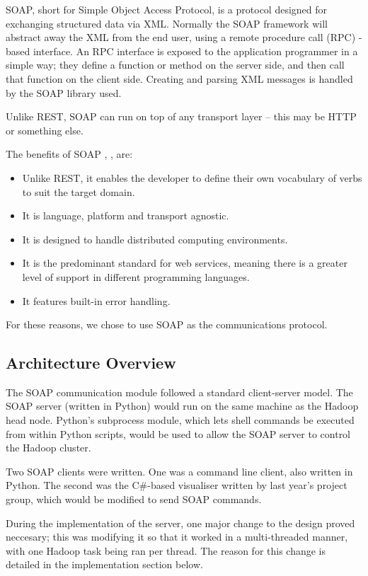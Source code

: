 SOAP, short for Simple Object Access Protocol, is a protocol designed for exchanging structured data via XML. Normally the SOAP framework will abstract away the XML from the end user, using a remote procedure call (RPC) -based interface. An RPC interface is exposed to the application programmer in a simple way; they define a function or method on the server side, and then call that function on the client side. Creating and parsing XML messages is handled by the SOAP library used.

Unlike REST, SOAP can run on top of any transport layer -- this may be HTTP or something else.

The benefits of SOAP \cite{infoq}, \cite{ajoxonomy}, are:
\begin{itemize}
\item Unlike REST, it enables the developer to define their own vocabulary of
verbs to suit the target domain.
\item It is language, platform and transport agnostic.
\item It is designed to handle distributed computing environments.
\item It is the predominant standard for web services, meaning there is a
greater level of support in different programming languages.
\item It features built-in error handling.
\end{itemize}

For these reasons, we chose to use SOAP as the communications protocol.

\subsection{Architecture Overview}

The SOAP communication module followed a standard client-server model. The SOAP server (written in Python) would run on the same machine as the Hadoop head node. Python's subprocess module, which lets shell commands be executed from within Python scripts, would be used to allow the SOAP server to control the Hadoop cluster.

Two SOAP clients were written. One was a command line client, also written in Python. The second was the C\#-based visualiser written by last year's project group, which would be modified to send SOAP commands.

During the implementation of the server, one major change to the design proved neccesary; this was modifying it so that it worked in a multi-threaded manner, with one Hadoop task being ran per thread. The reason for this change is detailed in the implementation section below.

